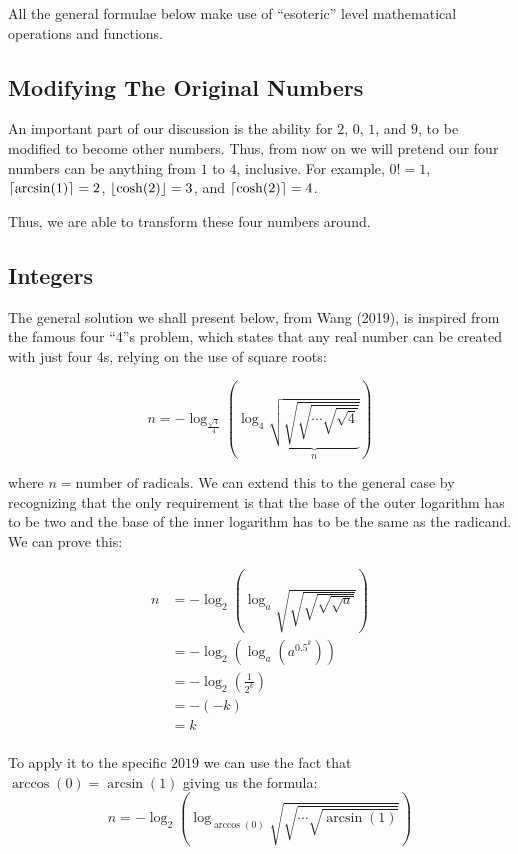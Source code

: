 All the general formulae below make use of ``esoteric'' level mathematical operations and functions.

\subsection{Modifying The Original Numbers}

An important part of our discussion is the ability for $2$, $0$, $1$, and $9$, to be modified to become other numbers. Thus, from now on we will pretend our four numbers can be anything from $1$ to $4$, inclusive. For example, $0! = 1$, $\lceil\arcsin(1)\rceil=2$, $\lfloor\cosh(2)\rfloor=3$, and $\lceil\cosh(2)\rceil=4$.

Thus, we are able to transform these four numbers around.

\subsection{Integers}

The general solution we shall present below, from Wang (2019), is inspired from the famous four ``4''s  problem, which states that any real number can be created with just four 4s, relying on the use of square roots:

\begin{equation}
    n = -\log_\frac{\sqrt{4}}{4}\left( \log_4 \underbrace{\sqrt{\sqrt{\sqrt{\cdots\sqrt{\sqrt{4}}}}}}_{n} \right)
\end{equation}

where $n=\textrm{number of radicals}$. We can extend this to the general case by recognizing that the only requirement is that the base of the outer logarithm has to be two and the base of the inner logarithm has to be the same as the radicand. We can prove this:

\begin{align*}
    n &= -\log_2\left(\log_a \sqrt{\sqrt{\sqrt{\sqrt{\sqrt{a}}}}}\right) \\
    &= -\log_2\left(\log_a \left(a^{0.5^k}\right)\right) \\
    &= -\log_2\left(\frac{1}{2^k}\right) \\
    &= -(-k) \\
    &= k \\
\end{align*}

To apply it to the specific $2019$ we can use the fact that $\arccos(0) = \arcsin(1)$ giving us the formula:
\begin{equation}
    n = -\log_2\left( \log_{\arccos(0)} \sqrt{\sqrt{\cdots\sqrt{\arcsin(1)}}}\right)
\end{equation}

